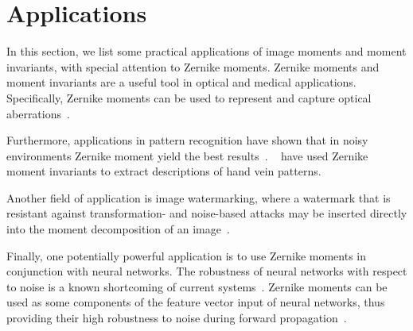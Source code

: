 \section{Applications}
In this section, we list some practical applications of image moments and moment invariants, with special attention to Zernike moments.
Zernike moments and moment invariants are a useful tool in optical and medical applications. Specifically, Zernike moments can be used to represent and capture optical aberrations~\cite{wavefront,optical_human_eye,opt_surf}.

Furthermore, applications in pattern recognition have shown that in noisy environments Zernike moment yield the best results~\cite{pattern_recognition}. \citeauthor{hand_vein}~\cite{hand_vein} have used Zernike moment invariants to extract descriptions of hand vein patterns.

Another field of application is image watermarking, where a watermark that is resistant against transformation- and noise-based attacks may be inserted directly into the moment decomposition of an image~\cite{watermarking_auth, robust_watermarking, invariant_watermark}.

Finally, one potentially powerful application is to use Zernike moments in conjunction with neural networks. The robustness of neural networks with respect to noise is a known shortcoming of current systems~\cite{nn_robust,nn_noise_robust}. Zernike moments can be used as some components of the feature vector input of neural networks, thus providing their high robustness to noise during forward propagation~\cite{zernike_nn,zernike_nn2}. 
